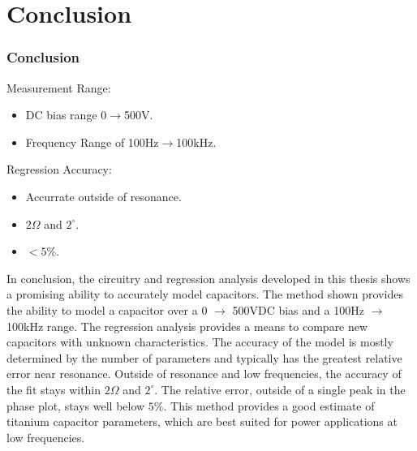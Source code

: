 \section {Conclusion}
\label{sec:conclusion}

\ifisPPT
\begin{frame}
    \frametitle{Conclusion}

Measurement Range:
\begin{itemize}
    \item DC bias range 0$\rightarrow$500V.
    \item Frequency Range of 100Hz$\rightarrow$100kHz.
\end{itemize}

Regression Accuracy:
\begin{itemize}
    \item Accurrate outside of resonance.
    \item $2 \Omega$ and $2^{\circ}$.
    \item $<5\%$.
\end{itemize}
\end{frame}
\else
In conclusion, the circuitry and regression analysis developed in this thesis shows a promising ability to accurately model capacitors. The method shown provides the ability to model a capacitor over a 0 $\rightarrow$ 500VDC bias and a 100Hz $\rightarrow$ 100kHz range. The regression analysis provides a means to compare new capacitors with unknown characteristics. The accuracy of the model is mostly determined by the number of parameters and typically has the greatest relative error near resonance. Outside of resonance and low frequencies, the accuracy of the fit stays within $2 \Omega$ and $2^{\circ}$. The relative error, outside of a single peak in the phase plot, stays well below $5\%$. This method provides a good estimate of titanium capacitor parameters, which are best suited for power applications  at low frequencies.
\fi

